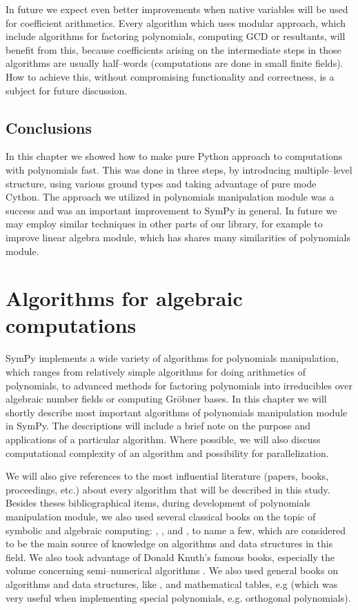 In future we expect even better improvements when native variables will be used for coefficient
arithmetics. Every algorithm which uses modular approach, which include algorithms for factoring
polynomials, computing GCD or resultants, will benefit from this, because coefficients arising
on the intermediate steps in those algorithms are usually half--words (computations are done in
small finite fields). How to achieve this, without compromising functionality and correctness,
is a subject for future discussion.


\section{Conclusions}

In this chapter we showed how to make pure Python approach to computations with polynomials fast.
This was done in three steps, by introducing multiple--level structure, using various ground types
and taking advantage of pure mode Cython. The approach we utilized in polynomials manipulation module
was a success and was an important improvement to SymPy in general. In future we may employ similar
techniques in other parts of our library, for example to improve linear algebra module, which has
shares many similarities of polynomials module.



\chapter{Algorithms for algebraic computations}\label{thesis-algorithms}

SymPy implements a wide variety of algorithms for polynomials manipulation, which ranges from
relatively simple algorithms for doing arithmetics of polynomials, to advanced methods for
factoring polynomials into irreducibles over algebraic number fields or computing Gröbner
bases. In this chapter we will shortly describe most important algorithms of polynomials
manipulation module in SymPy. The descriptions will include a brief note on the purpose and
applications of a particular algorithm. Where possible, we will also discuss computational
complexity of an algorithm and possibility for parallelization.

We will also give references to the most influential literature (papers, books, proceedings, etc.)
about every algorithm that will be described in this study. Besides theses bibliographical items,
during development of polynomials manipulation module, we also used several classical books on the
topic of symbolic and algebraic computing: \cite{Davenport1988systems}, \cite{Geddes1992algorithms},
\cite{Gathen1999modern} and \cite{Grabmeier2003algebra}, to name a few, which are considered to be the
main source of knowledge on algorithms and data structures in this field. We also took advantage
of Donald Knuth's famous books, especially the volume concerning semi--numerical algorithms
\cite{Knuth1985seminumerical}. We also used general books on algorithms and data structures, like
\cite{Cormen2001algorithms}, and mathematical tables, e.g \cite{Abramowitz1964handbook} (which was very
useful when implementing special polynomials, e.g. orthogonal polynomials).


